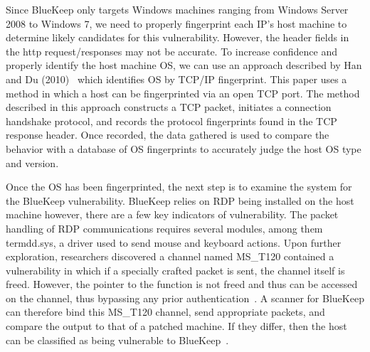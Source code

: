 Since BlueKeep only targets Windows machines ranging from Windows Server 2008 to Windows 7, we need to properly fingerprint each IP's host machine to determine likely candidates for this vulnerability. However, the header fields in the http request/responses may not be accurate. To increase confidence and properly identify the host machine OS, we can use an approach described by Han and Du (2010)~\cite{han_du_2010} which identifies OS by TCP/IP fingerprint. This paper uses a method in which a host can be fingerprinted via an open TCP port. The method described in this approach constructs a TCP packet, initiates a connection handshake protocol, and records the protocol fingerprints found in the TCP response header. Once recorded, the data gathered is used to compare the behavior with a database of OS fingerprints to accurately judge the host OS type and version.

Once the OS has been fingerprinted, the next step is to examine the system for the BlueKeep vulnerability. BlueKeep relies on RDP being installed on the host machine however, there are a few key indicators of vulnerability. The packet handling of RDP communications requires several modules, among them termdd.sys, a driver used to send mouse and keyboard actions. Upon further exploration, researchers discovered a channel named MS\_T120 contained a vulnerability in which if a specially crafted packet is sent, the channel itself is freed. However, the pointer to the function is not freed and thus can be accessed on the channel, thus bypassing any prior authentication~\cite{go_zingbox_com_2019}. A scanner for BlueKeep can therefore bind this MS\_T120 channel, send appropriate packets, and compare the output to that of a patched machine. If they differ, then the host can be classified as being vulnerable to BlueKeep~\cite{dillon_2019}.